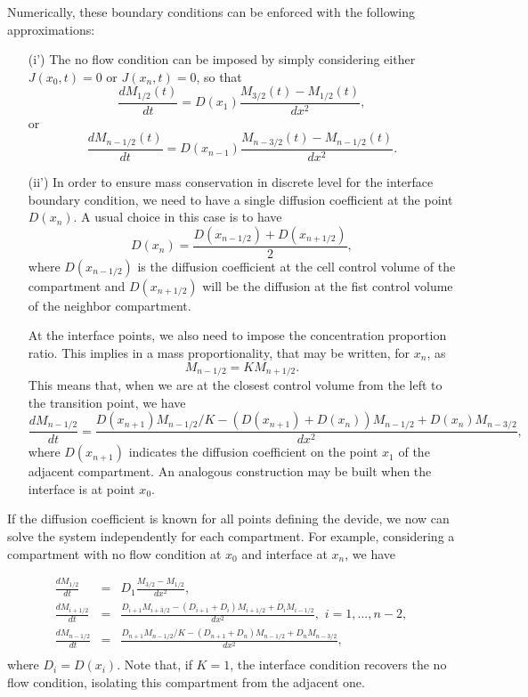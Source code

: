 \documentclass[final,1p,times]{elsarticle}
\begin{document}
Numerically, these boundary conditions can be enforced with the following approximations:
\begin{enumerate}
\item[(i')] The no flow condition can be imposed by simply considering either $J(x_0,t)=0$ or $J(x_n,t)=0$, so that
\begin{equation}
\frac{d M_{1/2}(t)}{dt}= D(x_{1})\frac{M_{3/2}(t)-M_{1/2}(t) }{dx^2},
\end{equation}
or
\begin{equation}
\frac{d M_{n-1/2}(t)}{dt}= D(x_{n-1})\frac{M_{n-3/2}(t)-M_{n-1/2}(t) }{dx^2}.
\end{equation}

\item[(ii')] 
In order to ensure mass conservation in discrete level for the interface boundary condition, we need to have a single diffusion coefficient at the point $D(x_n)$. A usual choice in this case is to have
\begin{equation}
D(x_n)= \frac{D(x_{n-1/2})+D(x_{n+1/2})}{2},
\end{equation}
where $D(x_{n-1/2})$ is the diffusion coefficient at the cell control volume of the compartment and $D(x_{n+1/2})$ will be the diffusion at the fist control volume of the neighbor compartment.

At the interface points, we also need to impose the concentration proportion ratio. This implies in a mass proportionality, that may be written, for $x_n$, as
\begin{equation}
M_{n-1/2}=K M_{n+1/2}.
\end{equation}
This means that, when we are at the closest control volume from the left to the transition point, we have
\begin{equation}
\frac{d M_{n-1/2}}{dt}= \frac{D(x_{n+1})M_{n-1/2}/K-(D(x_{n+1})+D(x_{n}))M_{n-1/2} + D(x_{n})M_{n-3/2}}{dx^2},
\end{equation}
where $D(x_{n+1})$ indicates the diffusion coefficient on the point $x_1$ of the adjacent compartment.
An analogous construction may be built when the interface is at point $x_0$.
\end{enumerate}


If the diffusion coefficient is known for all points defining the devide, we now can solve the system independently for each compartment. For example, considering a compartment with no flow condition at $x_0$ and interface at $x_n$, we have

\begin{eqnarray*}
\frac{d M_{1/2}}{dt}&=& D_1\frac{M_{3/2}-M_{1/2} }{dx^2},\\
\frac{d M_{i+1/2}}{dt}&=& \frac{D_{i+1}M_{i+3/2}-(D_{i+1}+D_{i})M_{i+1/2} + D_iM_{i-1/2}}{dx^2}, \,\, i=1,...,n-2,\\
\frac{d M_{n-1/2}}{dt}&=& \frac{D_{n+1}M_{n-1/2}/K-(D_{n+1}+D_{n})M_{n-1/2} + D_{n}M_{n-3/2}}{dx^2}, \\
\end{eqnarray*}
where $D_i=D(x_i)$. Note that, if $K=1$, the interface condition recovers the no flow condition, isolating this compartment from the adjacent one.
\end{document}
